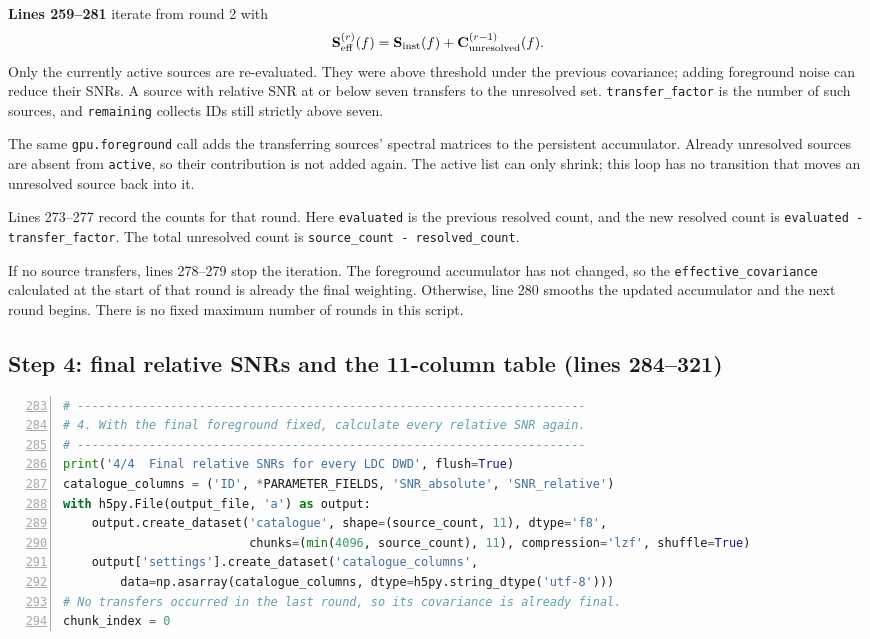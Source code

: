 \documentclass[11pt,a4paper]{article}
\newcommand{\code}[1]{\texttt{\nolinkurl{#1}}}
\newcommand{\linesref}[2]{\textbf{Lines #1--#2}}
\begin{document}
\linesref{259}{281} iterate from round 2 with
\[
\mathbf S_{\rm eff}^{(r)}(f)
=\mathbf S_{\rm inst}(f)+\mathbf C_{\rm unresolved}^{(r-1)}(f).
\]
Only the currently active sources are re-evaluated. They were above
threshold under the previous covariance; adding foreground noise can
reduce their SNRs. A source with relative SNR at or below seven transfers
to the unresolved set. \code{transfer_factor} is the number of such
sources, and \code{remaining} collects IDs still strictly above seven.

The same \code{gpu.foreground} call adds the transferring sources'
spectral matrices to the persistent accumulator. Already unresolved
sources are absent from \code{active}, so their contribution is not added
again. The active list can only shrink; this loop has no transition
that moves an unresolved source back into it.

Lines 273--277 record the counts for that round. Here \code{evaluated}
is the previous resolved count, and the new resolved count is
\code{evaluated - transfer_factor}. The total unresolved count is
\code{source_count - resolved_count}.

If no source transfers, lines 278--279 stop the iteration. The foreground
accumulator has not changed, so the \code{effective_covariance} calculated
at the start of that round is already the final weighting. Otherwise,
line 280 smooths the updated accumulator and the next round begins.
There is no fixed maximum number of rounds in this script.

\subsection{Step 4: final relative SNRs and the 11-column table (lines 284--321)}
\begin{lstlisting}[language=Python,numbers=left,showlines=true,firstnumber=283]
# -----------------------------------------------------------------------
# 4. With the final foreground fixed, calculate every relative SNR again.
# -----------------------------------------------------------------------
print('4/4  Final relative SNRs for every LDC DWD', flush=True)
catalogue_columns = ('ID', *PARAMETER_FIELDS, 'SNR_absolute', 'SNR_relative')
with h5py.File(output_file, 'a') as output:
    output.create_dataset('catalogue', shape=(source_count, 11), dtype='f8',
                          chunks=(min(4096, source_count), 11), compression='lzf', shuffle=True)
    output['settings'].create_dataset('catalogue_columns',
        data=np.asarray(catalogue_columns, dtype=h5py.string_dtype('utf-8')))
# No transfers occurred in the last round, so its covariance is already final.
chunk_index = 0
\end{lstlisting}
\end{document}
